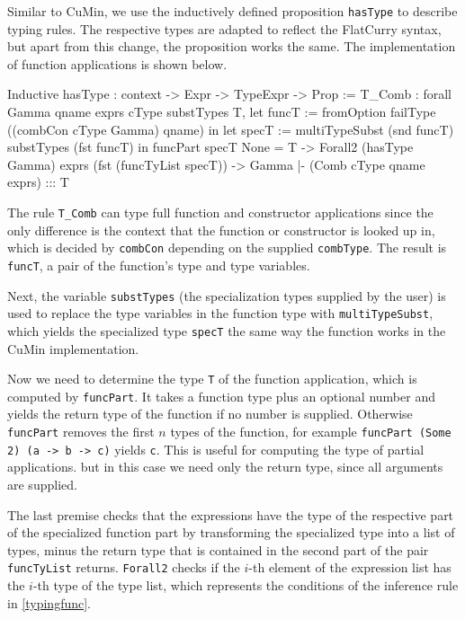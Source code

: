 \documentclass[paper = a4, fleqn, abstract=on, twoside]{scrreprt}
\newcommand{\coqinline}[1]{\texttt{#1}}
\begin{document}
\par \noindent
Similar to CuMin, we use the inductively defined proposition \texttt{hasType} to describe typing rules. The respective types are adapted to reflect the FlatCurry syntax, but apart from this change, the proposition works the same. The implementation of function applications is shown below.
\begin{coqcode}
Inductive hasType : context -> Expr -> TypeExpr -> Prop :=
T_Comb : forall Gamma qname exprs cType substTypes T,
           let funcT := fromOption failType ((combCon cType Gamma) qname) in
           let specT := multiTypeSubst (snd funcT) substTypes (fst funcT)
            in funcPart specT None = T ->
               Forall2 (hasType Gamma) exprs (fst (funcTyList specT)) ->
           Gamma |- (Comb cType qname exprs) ::: T
\end{coqcode}
The rule \texttt{T\_Comb} can type full function and constructor applications since the only difference is the context that the function or constructor is looked up in, which is decided by \texttt{combCon} depending on the supplied \texttt{combType}. The result is \texttt{funcT}, a pair of the function's type and type variables. 
\par
Next, the variable \texttt{substTypes} (the specialization types supplied by the user) is used to replace the type variables in the function type with \texttt{multiTypeSubst}, which yields the specialized type \coqinline{specT} the same way the function works in the CuMin implementation.
\par
Now we need to determine the type \texttt{T} of the function application, which is computed by \coqinline{funcPart}. It takes a function type plus an optional number and yields the return type of the function if no number is supplied. Otherwise \coqinline{funcPart} removes the first $n$ types of the function, for example \texttt{funcPart (Some 2) (a -> b -> c)} yields \texttt{c}. This is useful for computing the type of partial applications. but in this case we need only the return type, since all arguments are supplied.
\par
The last premise checks that the expressions have the type of the respective part of the specialized function part by transforming the specialized type into a list of types, minus the return type that is contained in the second part of the pair \texttt{funcTyList} returns. \coqinline{Forall2} checks if the $i$-th element of the expression list has the $i$-th type of the type list, which represents the conditions of the inference rule in \autoref{typingfunc}.
\end{document}
